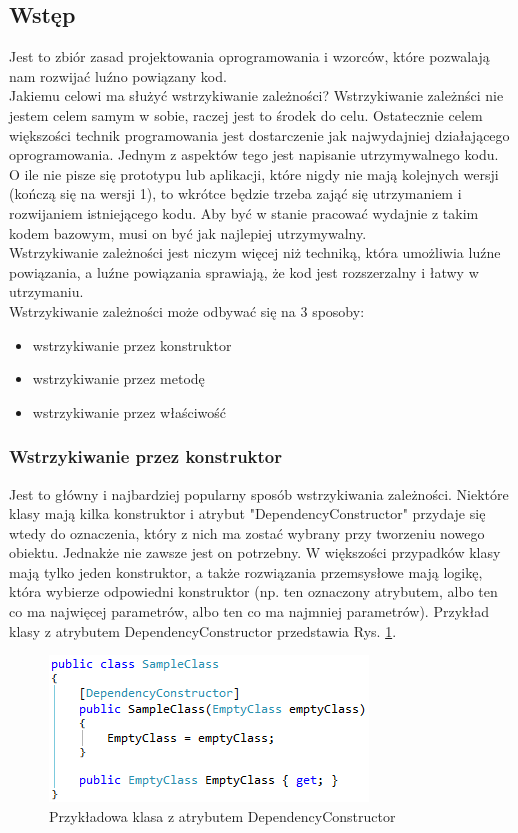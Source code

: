 \documentclass[12pt]{article}
\begin{document}
\subsection{Wstęp}
Jest to zbiór zasad projektowania oprogramowania i wzorców, które pozwalają nam rozwijać luźno powiązany kod.\\
Jakiemu celowi ma służyć wstrzykiwanie zależności? Wstrzykiwanie zależnści nie jestem celem samym w sobie, raczej jest to środek do celu. Ostatecznie celem większości technik programowania jest dostarczenie jak najwydajniej działającego oprogramowania. Jednym z aspektów tego jest napisanie utrzymywalnego kodu.\\
O ile nie pisze się prototypu lub aplikacji, które nigdy nie mają kolejnych wersji (kończą się na wersji 1), to wkrótce będzie trzeba zająć się utrzymaniem i rozwijaniem istniejącego kodu. Aby być w stanie pracować wydajnie z takim kodem bazowym, musi on być jak najlepiej utrzymywalny.\\
Wstrzykiwanie zależności jest niczym więcej niż techniką, która umożliwia luźne powiązania, a luźne powiązania sprawiają, że kod jest rozszerzalny i łatwy w utrzymaniu.\cite{dependency_injection}\\
Wstrzykiwanie zależności może odbywać się na 3 sposoby:
\begin{itemize}
	\item wstrzykiwanie przez konstruktor
	\item wstrzykiwanie przez metodę
	\item wstrzykiwanie przez właściwość
\end{itemize}

\subsubsection{Wstrzykiwanie przez konstruktor}
Jest to główny i najbardziej popularny sposób wstrzykiwania zależności. Niektóre klasy mają kilka konstruktor i atrybut "DependencyConstructor" przydaje się wtedy do oznaczenia, który z nich ma zostać wybrany przy tworzeniu nowego obiektu. Jednakże nie zawsze jest on potrzebny. W większości przypadków klasy mają tylko jeden konstruktor, a także rozwiązania przemsysłowe mają logikę, która wybierze odpowiedni konstruktor (np. ten oznaczony atrybutem, albo ten co ma najwięcej parametrów, albo ten co ma najmniej parametrów). Przykład klasy z atrybutem DependencyConstructor przedstawia Rys. \ref{fig:DependencyConstructor}.\\
\begin{figure}[H]
	\begin{center}
  		\includegraphics{DependencyConstructor.png}
  		\caption{Przykładowa klasa z atrybutem DependencyConstructor}
  		\label{fig:DependencyConstructor}
	\end{center}
\end{figure}
\end{document}
